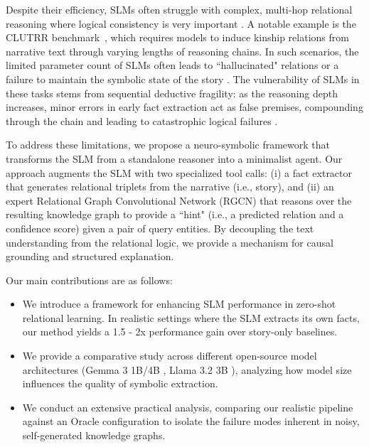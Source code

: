 \documentclass[
]{ceurart}
\begin{document}
\noindent Despite their efficiency, SLMs often struggle with complex, multi-hop relational reasoning where logical consistency is very important \cite{slms_scale, llm_abilities, llm_abilities1}. A notable example is the CLUTRR benchmark~\cite{sinha2019clutrr}, which requires models to induce kinship relations from narrative text through varying lengths of reasoning chains. In such scenarios, the limited parameter count of SLMs often leads to ``hallucinated" relations or a failure to maintain the symbolic state of the story \cite{slm_hallucinate, slm_hallucinate1}. The vulnerability of SLMs in these tasks stems from sequential deductive fragility: as the reasoning depth increases, minor errors in early fact extraction act as false premises, compounding through the chain and leading to catastrophic logical failures \cite{noise_compound, llm_abilities1}.

\noindent To address these limitations, we propose a neuro-symbolic framework that transforms the SLM from a standalone reasoner into a minimalist agent. Our approach augments the SLM with two specialized tool calls: (i) a fact extractor that generates relational triplets from the narrative (i.e., story), and (ii) an expert Relational Graph Convolutional Network (RGCN) \cite{rgcn} that reasons over the resulting knowledge graph to provide a ``hint" (i.e., a predicted relation and a confidence score) given a pair of query entities. By decoupling the text understanding from the relational logic, we provide a mechanism for causal grounding and structured explanation.

\noindent Our main contributions are as follows:
\begin{itemize}
\setlength\itemsep{.3em}
    \item We introduce a framework for enhancing SLM performance in zero-shot relational learning. In realistic settings where the SLM extracts its own facts, our method yields a 1.5 - 2x performance gain over story-only baselines.
    \item We provide a comparative study across different open-source model architectures (Gemma 3 1B/4B \cite{gemma}, Llama 3.2 3B \cite{llama}), analyzing how model size influences the quality of symbolic extraction.
    \item We conduct an extensive practical analysis, comparing our realistic pipeline against an Oracle configuration to isolate the failure modes inherent in noisy, self-generated knowledge graphs.
\end{itemize}
\end{document}
